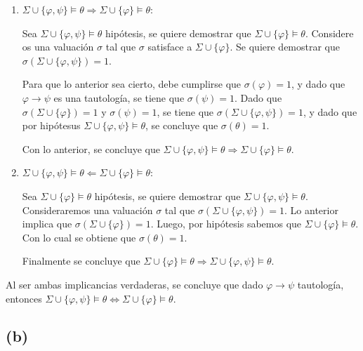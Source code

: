 \documentclass[12pt]{article}
\begin{document}
\begin{enumerate}
    \item $\Sigma \cup \{\varphi, \psi\}  \vDash \theta \Rightarrow \Sigma \cup \{\varphi\} \vDash \theta$:

    Sea $\Sigma \cup \{\varphi, \psi\} \vDash \theta$ hipótesis, se quiere demostrar que $\Sigma \cup \{\varphi\} \vDash \theta$.
    Considere os una valuación $\sigma$ tal que $\sigma$ satisface a $\Sigma \cup \{\varphi\}$. Se quiere demostrar que $\sigma (\Sigma \cup \{\varphi, \psi\}) = 1$.
    
    Para que lo anterior sea cierto, debe cumplirse que $\sigma (\varphi) = 1$, y dado que $\varphi \rightarrow \psi$ es una tautología, se tiene que $\sigma (\psi) = 1$.
    Dado que $\sigma(\Sigma \cup \{\varphi\}) = 1$ y $\sigma(\psi) = 1$, se tiene que $\sigma(\Sigma \cup \{\varphi, \psi\}) = 1$, y dado que por hipótesus 
    $\Sigma \cup \{\varphi, \psi\} \vDash \theta$, se concluye que $\sigma(\theta) = 1$.
    
    Con lo anterior, se concluye que $\Sigma \cup \{\varphi, \psi\}  \vDash \theta \Rightarrow \Sigma \cup \{\varphi\} \vDash \theta$.



    \item $\Sigma \cup \{\varphi, \psi\}  \vDash \theta \Leftarrow \Sigma \cup \{\varphi\} \vDash \theta$:
    
    Sea $\Sigma \cup \{\varphi\} \vDash \theta$ hipótesis, se quiere demostrar que $\Sigma \cup \{\varphi, \psi\}  \vDash \theta$.
    Consideraremos una valuación $\sigma$ tal que $\sigma (\Sigma \cup \{\varphi, \psi\}) = 1$.
    Lo anterior implica que $\sigma(\Sigma \cup \{\varphi\}) = 1$.
    Luego, por hipótesis sabemos que $\Sigma \cup \{\varphi\} \vDash \theta$.
    Con lo cual se obtiene que $\sigma(\theta) = 1$.

    Finalmente se concluye que $\Sigma \cup \{\varphi\} \vDash \theta \Rightarrow \Sigma \cup \{\varphi, \psi\}  \vDash \theta$.
\end{enumerate}

Al ser ambas implicancias verdaderas, se concluye que dado $\varphi \rightarrow \psi$ tautología, entonces $\Sigma \cup \{\varphi, \psi\}  \vDash \theta \Leftrightarrow \Sigma \cup \{\varphi\} \vDash \theta$.

\subsection*{(b)}
\end{document}
